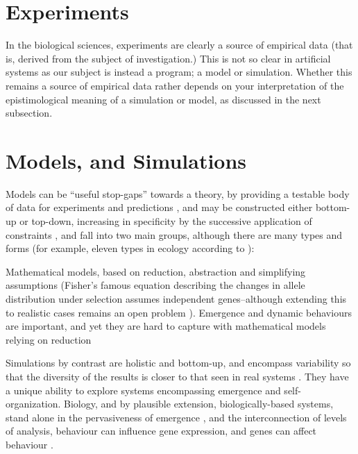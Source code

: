 \section{Experiments}\label{experiments}

In the biological sciences, experiments are clearly a source of empirical data (that is, derived from the subject of investigation.) This is not so clear in artificial systems as our subject is instead a program; a model or simulation. Whether this remains a source of empirical data rather depends on your interpretation of the epistimological meaning of a simulation or model, as discussed in the next subsection.

\section{Models, and Simulations}\label{models}


Models can be ``useful stop-gaps'' towards a theory, by providing a testable body of data for experiments and predictions \parencite{Krakauer2011}, and may be constructed either bottom-up or top-down, increasing in specificity by the successive application of constraints \parencite{Krakauer2011}, and fall into two main groups, although there are many types and forms (for example, eleven types in ecology according to \parencite{Jorgensen2008}):

Mathematical models, based on reduction, abstraction and simplifying assumptions (\eg Fisher's famous equation describing the changes in allele distribution under selection assumes independent genes--although extending this to realistic cases remains an open problem \parencite{Schuster2011}). Emergence and dynamic behaviours are important, and yet they are hard to capture with mathematical models relying on reduction \parencite{Ferrer:2008hv}

Simulations by contrast are holistic and bottom-up, and encompass variability so that the diversity of the results is closer to that seen in real systems \parencite{Ferrer:2008hv}. They have a unique ability to explore systems encompassing emergence and self-organization. Biology, and by plausible extension, biologically-based systems, stand alone in the pervasiveness of emergence \parencite{Bersini:2006ve}, and the interconnection of levels of analysis, \eg behaviour can influence gene expression, and genes can affect behaviour \parencite{Krakauer2011}.

